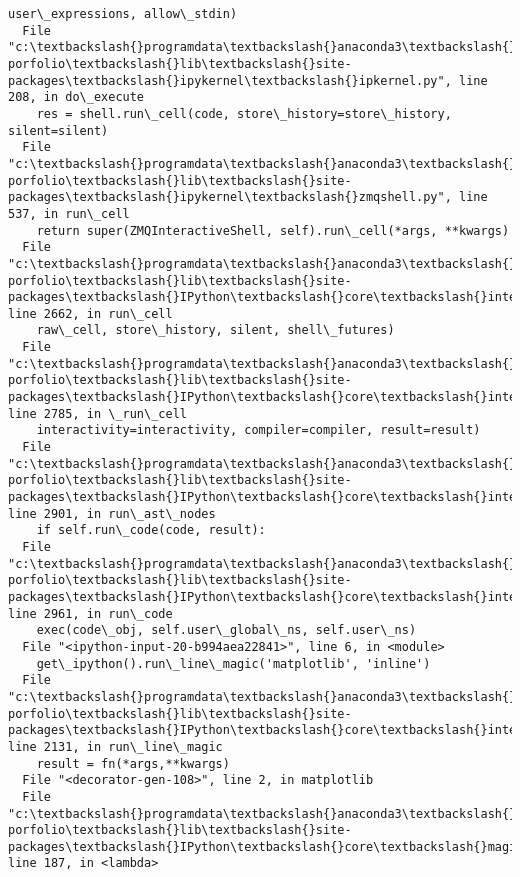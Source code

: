 \documentclass[11pt]{article}
\begin{document}
\begin{Verbatim}[commandchars=\\\{\}]
    user\_expressions, allow\_stdin)
  File "c:\textbackslash{}programdata\textbackslash{}anaconda3\textbackslash{}envs\textbackslash{}ml-porfolio\textbackslash{}lib\textbackslash{}site-packages\textbackslash{}ipykernel\textbackslash{}ipkernel.py", line 208, in do\_execute
    res = shell.run\_cell(code, store\_history=store\_history, silent=silent)
  File "c:\textbackslash{}programdata\textbackslash{}anaconda3\textbackslash{}envs\textbackslash{}ml-porfolio\textbackslash{}lib\textbackslash{}site-packages\textbackslash{}ipykernel\textbackslash{}zmqshell.py", line 537, in run\_cell
    return super(ZMQInteractiveShell, self).run\_cell(*args, **kwargs)
  File "c:\textbackslash{}programdata\textbackslash{}anaconda3\textbackslash{}envs\textbackslash{}ml-porfolio\textbackslash{}lib\textbackslash{}site-packages\textbackslash{}IPython\textbackslash{}core\textbackslash{}interactiveshell.py", line 2662, in run\_cell
    raw\_cell, store\_history, silent, shell\_futures)
  File "c:\textbackslash{}programdata\textbackslash{}anaconda3\textbackslash{}envs\textbackslash{}ml-porfolio\textbackslash{}lib\textbackslash{}site-packages\textbackslash{}IPython\textbackslash{}core\textbackslash{}interactiveshell.py", line 2785, in \_run\_cell
    interactivity=interactivity, compiler=compiler, result=result)
  File "c:\textbackslash{}programdata\textbackslash{}anaconda3\textbackslash{}envs\textbackslash{}ml-porfolio\textbackslash{}lib\textbackslash{}site-packages\textbackslash{}IPython\textbackslash{}core\textbackslash{}interactiveshell.py", line 2901, in run\_ast\_nodes
    if self.run\_code(code, result):
  File "c:\textbackslash{}programdata\textbackslash{}anaconda3\textbackslash{}envs\textbackslash{}ml-porfolio\textbackslash{}lib\textbackslash{}site-packages\textbackslash{}IPython\textbackslash{}core\textbackslash{}interactiveshell.py", line 2961, in run\_code
    exec(code\_obj, self.user\_global\_ns, self.user\_ns)
  File "<ipython-input-20-b994aea22841>", line 6, in <module>
    get\_ipython().run\_line\_magic('matplotlib', 'inline')
  File "c:\textbackslash{}programdata\textbackslash{}anaconda3\textbackslash{}envs\textbackslash{}ml-porfolio\textbackslash{}lib\textbackslash{}site-packages\textbackslash{}IPython\textbackslash{}core\textbackslash{}interactiveshell.py", line 2131, in run\_line\_magic
    result = fn(*args,**kwargs)
  File "<decorator-gen-108>", line 2, in matplotlib
  File "c:\textbackslash{}programdata\textbackslash{}anaconda3\textbackslash{}envs\textbackslash{}ml-porfolio\textbackslash{}lib\textbackslash{}site-packages\textbackslash{}IPython\textbackslash{}core\textbackslash{}magic.py", line 187, in <lambda>

\end{Verbatim}
\end{document}
